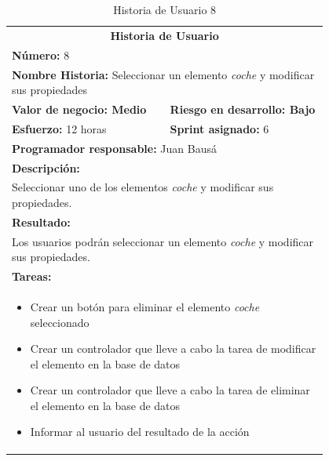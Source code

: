 	\begin{table}[H]
	  \centering 
	 	\begin{tabular}{p{0.4\linewidth}p{0.4\linewidth}}
	    \toprule
	    \multicolumn{2}{c}{\cellcolor{black!30}\textbf{Historia de Usuario}} 													\\
		\multicolumn{2}{l}{\cellcolor{gray!25}\textbf{Número: }8}																\\
		\multicolumn{2}{l}{\textbf{Nombre Historia: } Seleccionar un elemento \textit{coche} y modificar sus propiedades}							\\
		\cellcolor{gray!25}\textbf{Valor de negocio: Medio}	&	\cellcolor{gray!25}\textbf{Riesgo en desarrollo: Bajo}		\\
		\textbf{Esfuerzo:} 12 horas				&	\textbf{Sprint asignado: }6 												\\
		\multicolumn{2}{l}{\cellcolor{gray!25}\textbf{Programador responsable: }Juan Bausá}									\\
		\multicolumn{2}{l}{\textbf{Descripción:}}                                                     						\\
		\multicolumn{2}{l}{\parbox{15cm}{Seleccionar uno de los elementos \textit{coche} y modificar sus propiedades.}}				\\
		\multicolumn{2}{l}{\cellcolor{gray!25}\textbf{Resultado:}}																\\		
		\multicolumn{2}{l}{\parbox{15cm}{Los usuarios podrán seleccionar un elemento \textit{coche} y modificar sus propiedades.}}																								\\
		\multicolumn{2}{l}{\textbf{Tareas:}}																					\\
		\multicolumn{2}{l}{
			\begin{minipage}{12cm}
	    		\vskip 4pt
	    		\begin{itemize}
	    			\item Crear un botón para eliminar el elemento \textit{coche} seleccionado
	    			\item Crear un controlador que lleve a cabo la tarea de modificar el elemento en la base de datos
	     			\item Crear un controlador que lleve a cabo la tarea de eliminar el elemento en la base de datos
	    			\item Informar al usuario del resultado de la acción
				\end{itemize}
			  	\vskip 4pt
		 	\end{minipage}
		} \\																				
	    \hline
	  \end{tabular}
	  \caption{Historia de Usuario 8}
	\end{table}
	
